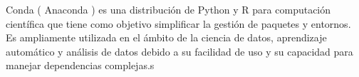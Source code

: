 Conda ( Anaconda ) es una distribución de Python y R para computación científica que tiene como objetivo simplificar la gestión de paquetes y entornos. Es ampliamente utilizada en el ámbito de la ciencia de datos, aprendizaje automático y análisis de datos debido a su facilidad de uso y su capacidad para manejar dependencias complejas.s